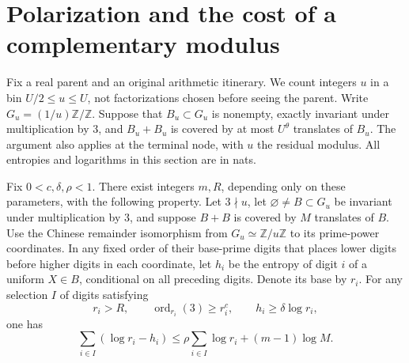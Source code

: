 \section{Polarization and the cost of a complementary modulus}\label{sec:tariff}

Fix a real parent and an original arithmetic itinerary. We count integers
$u$ in a bin $U/2\le u\le U$, not factorizations chosen before seeing the
parent. Write $G_u=(1/u)\mathbb Z/\mathbb Z$. Suppose that $B_u\subset
G_u$ is nonempty, exactly invariant under multiplication by $3$, and
$B_u+B_u$ is covered by at most $U^\theta$ translates of $B_u$.
The argument also applies at the terminal node, with $u$ the residual
modulus. All entropies and logarithms in this section are in nats.

\begin{lemma}\label{lem:digits}
Fix $0<c,\delta,\rho<1$. There exist integers $m,R$, depending only on
these parameters, with the following property. Let $3\nmid u$, let
$\varnothing\ne B\subset G_u$ be invariant under multiplication by $3$,
and suppose $B+B$ is covered by $M$ translates of $B$. Use the Chinese
remainder isomorphism from $G_u\simeq\mathbb Z/u\mathbb Z$ to its
prime-power coordinates. In any fixed order of their base-prime digits
that places lower digits before higher digits in each coordinate, let
$h_i$ be the entropy of digit $i$ of a uniform $X\in B$, conditional on
all preceding digits. Denote its base by $r_i$. For any selection $I$
of digits satisfying
\[
 r_i>R,\qquad \operatorname{ord}_{r_i}(3)\ge r_i^c,
 \qquad h_i\ge\delta\log r_i ,
\]
one has
\[
 \sum_{i\in I}(\log r_i-h_i)
 \le \rho\sum_{i\in I}\log r_i+(m-1)\log M .
\]
\end{lemma}

